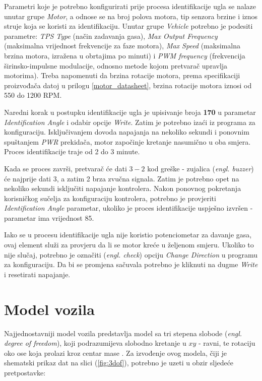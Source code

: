 Parametri koje je potrebno konfigurirati prije procesa identifikacije ugla se nalaze unutar grupe \textit{Motor}, a odnose se na broj polova motora, tip senzora brzine i iznos struje koja se koristi za identifikaciju. Unutar grupe \textit{Vehicle} potrebno je podesiti parametre: \textit{TPS Type} (način zadavanja gasa), \textit{Max Output Frequency} (maksimalna vrijednost frekvencije za faze motora), \textit{Max Speed} (maksimalna brzina motora, izražena u obrtajima po minuti) i \textit{PWM frequency} (frekvencija širinsko-impulsne modulacije, odnosno metode kojom pretvarač upravlja motorima). Treba napomenuti da brzina rotacije motora, prema specifikaciji proizvođača datoj u prilogu \ref{motor_datasheet}, brzina rotacije motora iznosi od 550 do 1200 RPM.

Naredni korak u postupku identifikacije ugla je upisivanje broja \textbf{170} u parametar \textit{Identification Angle} i odabir opcije \textit{Write}. Zatim je potrebno izaći iz programa za konfiguraciju. Isključivanjem dovoda napajanja na nekoliko sekundi i ponovnim spuštanjem \textit{PWR} prekidača, motor započinje kretanje nasumično u oba smjera. Proces identifikacije traje od 2 do 3 minute.

Kada se proces završi, pretvarač će dati $3-2$ kod greške - zujalica (\textit{engl. buzzer}) će najprije dati 3, a zatim 2 brza zvučna signala. Zatim je potrebno opet na nekoliko sekundi isključiti napajanje kontrolera. Nakon ponovnog pokretanja korisničkog sučelja za konfiguraciju kontrolera, potrebno je provjeriti \textit{Identification Angle} parametar, ukoliko je proces identifikacije uspješno izvršen - parametar ima vrijednost 85.

Iako se u procesu identifikacije ugla nije koristio potenciometar za davanje gasa, ovaj element služi za provjeru da li se motor kreće u željenom smjeru. Ukoliko to nije slučaj, potrebno je označiti (\textit{engl. check}) opciju \textit{Change Direction} u programu za konfiguraciju. Da bi se promjena sačuvala potrebno je kliknuti na dugme \textit{Write} i resetirati napajanje.

\section{Model vozila}

\qquad Najjednostavniji model vozila predstavlja model sa tri stepena slobode (\textit{engl. degree of freedom}), koji podrazumijeva slobodno kretanje u $xy$ - ravni, te rotaciju oko ose koja prolazi kroz centar mase \cite{zhu2019braking}. Za izvođenje ovog modela, čiji je shematski prikaz dat na slici (\ref{fig:3dof}), potrebno je uzeti u obzir sljedeće pretpostavke:

